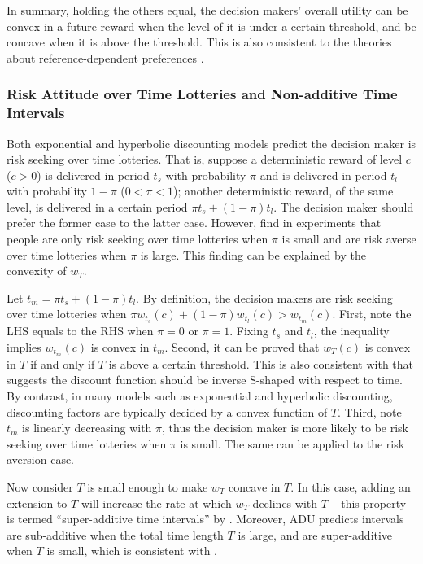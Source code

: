 \documentclass[
  12pt,
]{article}
\begin{document}
In summary, holding the others equal, the decision makers' overall
utility can be convex in a future reward when the level of it is under a
certain threshold, and be concave when it is above the threshold. This
is also consistent to the theories about reference-dependent preferences
\citep{koszegi_model_2006}.

\hypertarget{risk-attitude-over-time-lotteries-and-non-additive-time-intervals}{%
\subsubsection{Risk Attitude over Time Lotteries and Non-additive Time
Intervals}\label{risk-attitude-over-time-lotteries-and-non-additive-time-intervals}}

Both exponential and hyperbolic discounting models predict the decision
maker is risk seeking over time lotteries. That is, suppose a
deterministic reward of level \(c\) (\(c>0\)) is delivered in period
\(t_s\) with probability \(\pi\) and is delivered in period \(t_l\) with
probability \(1-\pi\) (\(0<\pi<1\)); another deterministic reward, of
the same level, is delivered in a certain period
\(\pi t_s +(1-\pi) t_l\). The decision maker should prefer the former
case to the latter case. However, \citet{onay_intertemporal_2007} find
in experiments that people are only risk seeking over time lotteries
when \(\pi\) is small and are risk averse over time lotteries when
\(\pi\) is large. This finding can be explained by the convexity of
\(w_T\).

Let \(t_m = \pi t_s +(1-\pi) t_l\). By definition, the decision makers
are risk seeking over time lotteries when
\(\pi w_{t_s}(c)+(1-\pi)w_{t_l}(c)>w_{t_m}(c)\). First, note the LHS
equals to the RHS when \(\pi=0\) or \(\pi=1\). Fixing \(t_s\) and
\(t_l\), the inequality implies \(w_{t_m}(c)\) is convex in \(t_m\).
Second, it can be proved that \(w_T(c)\) is convex in \(T\) if and only
if \(T\) is above a certain threshold. This is also consistent with
\citet{takeuchi_non-parametric_2011} that suggests the discount function
should be inverse S-shaped with respect to time. By contrast, in many
models such as exponential and hyperbolic discounting, discounting
factors are typically decided by a convex function of \(T\). Third, note
\(t_m\) is linearly decreasing with \(\pi\), thus the decision maker is
more likely to be risk seeking over time lotteries when \(\pi\) is
small. The same can be applied to the risk aversion case.

Now consider \(T\) is small enough to make \(w_T\) concave in \(T\). In
this case, adding an extension to \(T\) will increase the rate at which
\(w_T\) declines with \(T\) -- this property is termed ``super-additive
time intervals'' by \citet{read_is_2001}. Moreover, ADU predicts
intervals are sub-additive when the total time length \(T\) is large,
and are super-additive when \(T\) is small, which is consistent with
\citet{scholten_discounting_2006}.
\end{document}
